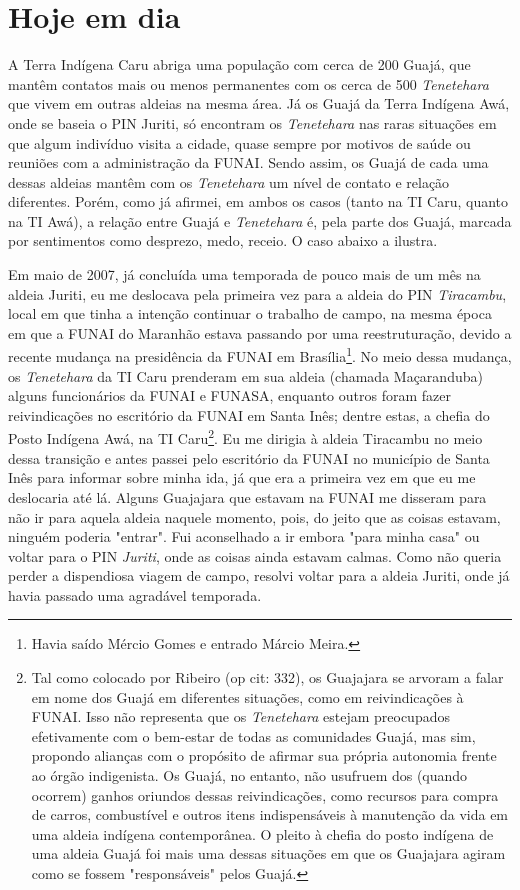 \section{Hoje em dia}

A Terra Indígena Caru abriga uma população com cerca de 200 Guajá, que
mantêm contatos mais ou menos permanentes com os cerca de 500
\emph{Tenetehara} que vivem em outras aldeias na mesma área. Já os Guajá
da Terra Indígena Awá, onde se baseia o PIN Juriti, só encontram os
\emph{Tenetehara} nas raras situações em que algum indivíduo visita a
cidade, quase sempre por motivos de saúde ou reuniões com a
administração da FUNAI. Sendo assim, os Guajá de cada uma dessas aldeias
mantêm com os \emph{Tenetehara} um nível de contato e relação
diferentes. Porém, como já afirmei, em ambos os casos (tanto na TI Caru,
quanto na TI Awá), a relação entre Guajá e \emph{Tenetehara} é, pela
parte dos Guajá, marcada por sentimentos como desprezo, medo, receio. O
caso abaixo a ilustra.

Em maio de 2007, já concluída uma temporada de pouco mais de um mês na
aldeia Juriti, eu me deslocava pela primeira vez para a aldeia do PIN
\emph{Tiracambu}, local em que tinha a intenção continuar o trabalho de
campo, na mesma época em que a FUNAI do Maranhão estava passando por uma
reestruturação, devido a recente mudança na presidência da FUNAI em
Brasília\footnote{Havia saído Mércio Gomes e entrado Márcio Meira.}. No
meio dessa mudança, os \emph{Tenetehara} da TI Caru prenderam em sua
aldeia (chamada Maçaranduba) alguns funcionários da FUNAI e FUNASA,
enquanto outros foram fazer reivindicações no escritório da FUNAI em
Santa Inês; dentre estas, a chefia do Posto Indígena Awá, na TI
Caru\footnote{Tal como colocado por Ribeiro (op cit: 332), os Guajajara
  se arvoram a falar em nome dos Guajá em diferentes situações, como em
  reivindicações à FUNAI. Isso não representa que os \emph{Tenetehara}
  estejam preocupados efetivamente com o bem-estar de todas as
  comunidades Guajá, mas sim, propondo alianças com o propósito de
  afirmar sua própria autonomia frente ao órgão indigenista. Os Guajá,
  no entanto, não usufruem dos (quando ocorrem) ganhos oriundos dessas
  reivindicações, como recursos para compra de carros, combustível e
  outros itens indispensáveis à manutenção da vida em uma aldeia
  indígena contemporânea. O pleito à chefia do posto indígena de uma
  aldeia Guajá foi mais uma dessas situações em que os Guajajara agiram
  como se fossem "responsáveis" pelos Guajá.}. Eu me dirigia à aldeia
Tiracambu no meio dessa transição e antes passei pelo escritório da
FUNAI no município de Santa Inês para informar sobre minha ida, já que
era a primeira vez em que eu me deslocaria até lá. Alguns Guajajara que
estavam na FUNAI me disseram para não ir para aquela aldeia naquele
momento, pois, do jeito que as coisas estavam, ninguém poderia "entrar".
Fui aconselhado a ir embora "para minha casa" ou voltar para o PIN
\emph{Juriti}, onde as coisas ainda estavam calmas. Como não queria
perder a dispendiosa viagem de campo, resolvi voltar para a aldeia
Juriti, onde já havia passado uma agradável temporada.

